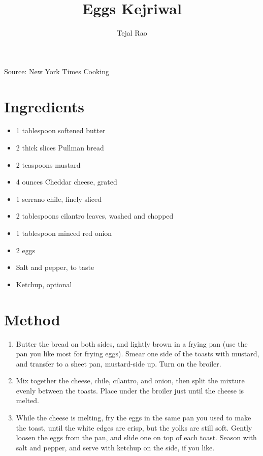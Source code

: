 \documentclass[12pt]{article}
\author{Tejal Rao}
\title{Eggs Kejriwal}
\date{}
\begin{document}
\begin{multicols*}{2}
\maketitle

Source: New York Times Cooking

\section{Ingredients}

\begin{itemize}
    \item 1 tablespoon softened butter
    \item 2 thick slices Pullman bread
    \item 2 teaspoons mustard
    \item 4 ounces Cheddar cheese, grated
    \item 1 serrano chile, finely sliced
    \item 2 tablespoons cilantro leaves, washed and chopped
    \item 1 tablespoon minced red onion
    \item 2 eggs
    \item Salt and pepper, to taste
    \item Ketchup, optional
\end{itemize}

\section{Method}

\begin{enumerate}
    \item Butter the bread on both sides, and lightly brown in a frying pan (use the pan you like most for frying eggs). Smear one side of the toasts with mustard, and transfer to a sheet pan, mustard-side up. Turn on the broiler.
    \item Mix together the cheese, chile, cilantro, and onion, then split the mixture evenly between the toasts. Place under the broiler just until the cheese is melted.
    \item While the cheese is melting, fry the eggs in the same pan you used to make the toast, until the white edges are crisp, but the yolks are still soft. Gently loosen the eggs from the pan, and slide one on top of each toast. Season with salt and pepper, and serve with ketchup on the side, if you like.
\end{enumerate}

\end{multicols*}
\end{document}
